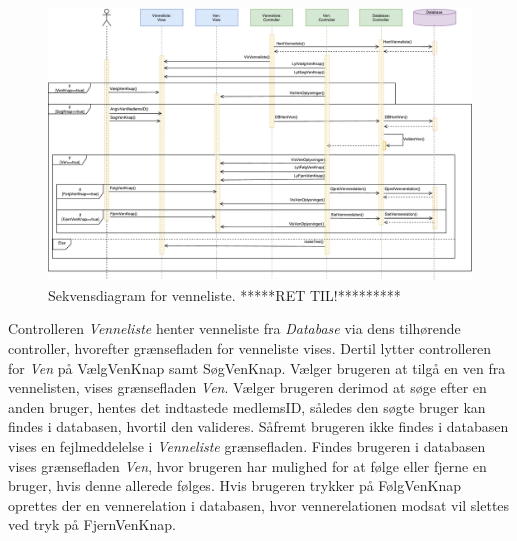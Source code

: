 \begin{figure} [H]
\centering
\includegraphics[width=1.55\textwidth, angle=90]{figures/Sek/SEKVenneliste}
\caption{Sekvensdiagram for venneliste. *****RET TIL!*********}
\label{fig:SEKVenneliste}
\end{figure}

\noindent
Controlleren \textit{Venneliste} henter venneliste fra \textit{Database} via dens tilhørende controller, hvorefter grænsefladen for venneliste vises. 
Dertil lytter controlleren for \textit{Ven} på VælgVenKnap samt SøgVenKnap. Vælger brugeren at tilgå en ven fra vennelisten, vises grænsefladen \textit{Ven}. Vælger brugeren derimod at søge efter en anden bruger, hentes det indtastede medlemsID, således den søgte bruger kan findes i databasen, hvortil den valideres. Såfremt brugeren ikke findes i databasen vises en fejlmeddelelse i \textit{Venneliste} grænsefladen. Findes brugeren i databasen vises grænsefladen \textit{Ven}, hvor brugeren har mulighed for at følge eller fjerne en bruger, hvis denne allerede følges. Hvis brugeren trykker på FølgVenKnap oprettes der en vennerelation i databasen, hvor vennerelationen modsat vil slettes ved tryk på FjernVenKnap. 




